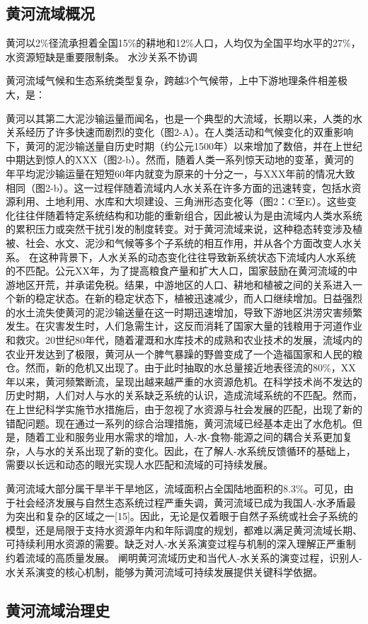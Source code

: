 
\subsection{黄河流域概况}



黄河以2\%径流承担着全国15\%的耕地和12\%人口，人均仅为全国平均水平的27\%，水资源短缺是重要限制条。
水沙关系不协调

黄河流域气候和生态系统类型复杂，跨越3个气候带，上中下游地理条件相差极大，是：


黄河以其第二大泥沙输运量而闻名，也是一个典型的大流域，长期以来，人类的水关系经历了许多快速而剧烈的变化（图2-A）。在人类活动和气候变化的双重影响下，黄河的泥沙输送量自历史时期（约公元1500年）以来增加了数倍，并在上世纪中期达到惊人的XXX（图2-b）。然而，随着人类一系列惊天动地的变革，黄河的年平均泥沙输运量在短短60年内就变为原来的十分之一，与XXX年前的情况大致相同（图2-b）。这一过程伴随着流域内人水关系在许多方面的迅速转变，包括水资源利用、土地利用、水库和大坝建设、三角洲形态变化等（图2：C至E）。这些变化往往伴随着特定系统结构和功能的重新组合，因此被认为是由流域内人类水系统的累积压力或突然干扰引发的制度转变。对于黄河流域来说，这种稳态转变涉及植被、社会、水文、泥沙和气候等多个子系统的相互作用，并从各个方面改变人水关系。
在这种背景下，人水关系的动态变化往往导致新系统状态下流域内人水系统的不匹配。公元XX年，为了提高粮食产量和扩大人口，国家鼓励在黄河流域的中游地区开荒，并承诺免税。结果，中游地区的人口、耕地和植被之间的关系进入一个新的稳定状态。在新的稳定状态下，植被迅速减少，而人口继续增加。日益强烈的水土流失使黄河的泥沙输送量在这一时期迅速增加，导致下游地区洪涝灾害频繁发生。在灾害发生时，人们急需生计，这反而消耗了国家大量的钱粮用于河道作业和救灾。20世纪80年代，随着灌溉和水库技术的成熟和农业技术的发展，流域内的农业开发达到了极限，黄河从一个脾气暴躁的野兽变成了一个造福国家和人民的粮仓。然而，新的危机又出现了。由于此时抽取的水总量接近地表径流的80\%，XX年以来，黄河频繁断流，呈现出越来越严重的水资源危机。在科学技术尚不发达的历史时期，人们对人与水的关系缺乏系统的认识，造成流域系统的不匹配。然而，在上世纪科学实施节水措施后，由于忽视了水资源与社会发展的匹配，出现了新的错配问题。现在通过一系列的综合治理措施，黄河流域已经基本走出了水危机。但是，随着工业和服务业用水需求的增加，人-水-食物-能源之间的耦合关系更加复杂，人与水的关系出现了新的变化。因此，在了解人-水系统反馈循环的基础上，需要以长远和动态的眼光实现人水匹配和流域的可持续发展。


黄河流域大部分属干旱半干旱地区，流域面积占全国陆地面积的8.3\%。可见，由于社会经济发展与自然生态系统过程严重失调，黄河流域已成为我国人-水矛盾最为突出和复杂的区域之一[15]。因此，无论是仅着眼于自然子系统或社会子系统的模型，还是局限于支持水资源年内和年际调度的规划，都难以满足黄河流域长期、可持续利用水资源的需要。缺乏对人-水关系演变过程与机制的深入理解正严重制约着流域的高质量发展。
阐明黄河流域历史和当代人-水关系的演变过程，识别人-水关系演变的核心机制，能够为黄河流域可持续发展提供关键科学依据。

\subsection{黄河流域治理史}
